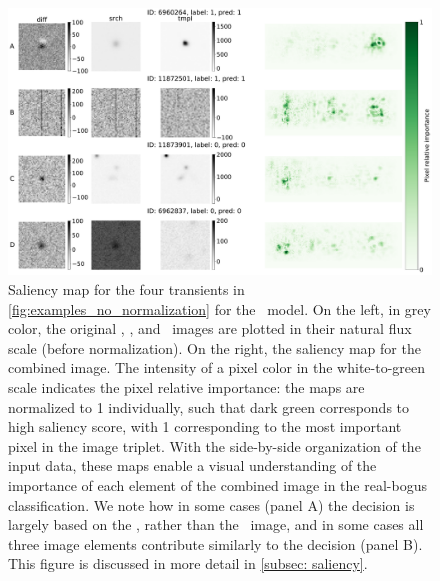 \begin{figure}
    \centering
    \includegraphics[width=0.9\linewidth]{
    figures/saliency_plot.pdf}
    \caption{Saliency map for the four transients in \autoref{fig:examples_no_normalization} for the \diabased\ model. On the left, in grey color, the original \diff, \search, and \temp\ images are plotted in their natural flux scale (before normalization). On the right, the saliency map for the combined image. The intensity of a pixel color in the white-to-green scale indicates the pixel relative importance: the maps are normalized to 1 individually, such that dark green corresponds to high saliency score, with 1 corresponding to the most important pixel in the image triplet. With the side-by-side organization of the input data, these maps enable a visual understanding of the importance of each element of the combined image in the real-bogus classification. We note how in some cases (panel A) the decision is largely based on the \temp, rather than the \diff\ image, and in some cases all three image elements contribute similarly to the decision (panel B). This figure is discussed in more detail in \autoref{subsec: saliency}.}
    \label{fig:saliency_4id}
\end{figure}

